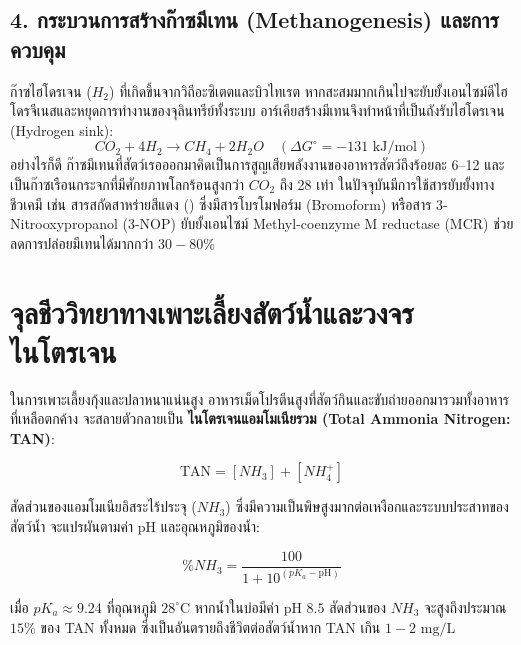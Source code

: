 \subsection{4. กระบวนการสร้างก๊าซมีเทน (Methanogenesis) และการควบคุม}
ก๊าซไฮโดรเจน ($H_2$) ที่เกิดขึ้นจากวิถีอะซิเตตและบิวไทเรต หากสะสมมากเกินไปจะยับยั้งเอนไซม์ดีไฮโดรจีเนสและหยุดการทำงานของจุลินทรีย์ทั้งระบบ อาร์เคียสร้างมีเทนจึงทำหน้าที่เป็นถังรับไฮโดรเจน (Hydrogen sink):
\begin{equation}
CO_2 + 4 H_2 \longrightarrow CH_4 + 2 H_2O \quad (\Delta G^\circ = -131\text{ kJ/mol})
\end{equation}
อย่างไรก็ดี ก๊าซมีเทนที่สัตว์เรอออกมาคิดเป็นการสูญเสียพลังงานของอาหารสัตว์ถึงร้อยละ 6--12 และเป็นก๊าซเรือนกระจกที่มีศักยภาพโลกร้อนสูงกว่า $CO_2$ ถึง 28 เท่า ในปัจจุบันมีการใช้สารยับยั้งทางชีวเคมี เช่น สารสกัดสาหร่ายสีแดง () ซึ่งมีสารโบรโมฟอร์ม (Bromoform) หรือสาร 3-Nitrooxypropanol (3-NOP) ยับยั้งเอนไซม์ Methyl-coenzyme M reductase (MCR) ช่วยลดการปล่อยมีเทนได้มากกว่า $30 - 80\%$

\section{จุลชีววิทยาทางเพาะเลี้ยงสัตว์น้ำและวงจรไนโตรเจน}

ในการเพาะเลี้ยงกุ้งและปลาหนาแน่นสูง อาหารเม็ดโปรตีนสูงที่สัตว์กินและขับถ่ายออกมารวมทั้งอาหารที่เหลือตกค้าง จะสลายตัวกลายเป็น \textbf{ไนโตรเจนแอมโมเนียรวม (Total Ammonia Nitrogen: TAN)}:

\begin{equation}
\text{TAN} = [NH_3] + [NH_4^+]
\end{equation}

สัดส่วนของแอมโมเนียอิสระไร้ประจุ ($NH_3$) ซึ่งมีความเป็นพิษสูงมากต่อเหงือกและระบบประสาทของสัตว์น้ำ จะแปรผันตามค่า pH และอุณหภูมิของน้ำ:

\begin{equation}
\% NH_3 = \frac{100}{1 + 10^{(pK_a - \text{pH})}}
\end{equation}

เมื่อ $pK_a \approx 9.24$ ที่อุณหภูมิ $28^\circ\text{C}$ หากน้ำในบ่อมีค่า $\text{pH } 8.5$ สัดส่วนของ $NH_3$ จะสูงถึงประมาณ $15\%$ ของ TAN ทั้งหมด ซึ่งเป็นอันตรายถึงชีวิตต่อสัตว์น้ำหาก TAN เกิน $1 - 2\text{ mg/L}$

